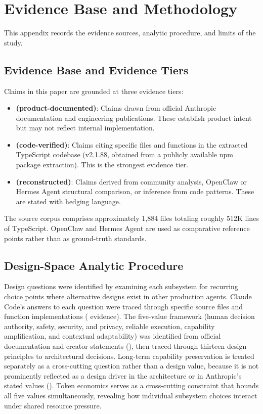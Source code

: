 \section*{Evidence Base and Methodology}
\label{sec:method}

This appendix records the evidence sources, analytic procedure, and limits of the study.

\subsection*{Evidence Base and Evidence Tiers}

Claims in this paper are grounded at three evidence tiers:

\begin{itemize}[nosep]
  \item \tierA{} \textbf{(product-documented)}: Claims drawn from official Anthropic documentation and engineering publications. These establish product intent but may not reflect internal implementation.
  \item \tierB{} \textbf{(code-verified)}: Claims citing specific files and functions in the extracted TypeScript codebase (v2.1.88, obtained from a publicly available npm package extraction). This is the strongest evidence tier.
  \item \tierC{} \textbf{(reconstructed)}: Claims derived from community analysis, OpenClaw or Hermes Agent structural comparison, or inference from code patterns. These are stated with hedging language.
\end{itemize}

The source corpus comprises approximately 1,884 files totaling roughly 512K lines of TypeScript.
OpenClaw and Hermes Agent are used as comparative reference points rather than as ground-truth standards.

\subsection*{Design-Space Analytic Procedure}

Design questions were identified by examining each subsystem for recurring choice points where alternative designs exist in other production agents.
Claude Code's answers to each question were traced through specific source files and function implementations (\tierB{} evidence).
The five-value framework (human decision authority, safety, security, and privacy, reliable execution, capability amplification, and contextual adaptability) was identified from official documentation and creator statements (\tierA{}), then traced through thirteen design principles to architectural decisions.
Long-term capability preservation is treated separately as a cross-cutting question rather than a design value, because it is not prominently reflected as a design driver in the architecture or in Anthropic's stated values ().
Token economics serves as a cross-cutting constraint that bounds all five values simultaneously, revealing how individual subsystem choices interact under shared resource pressure.


